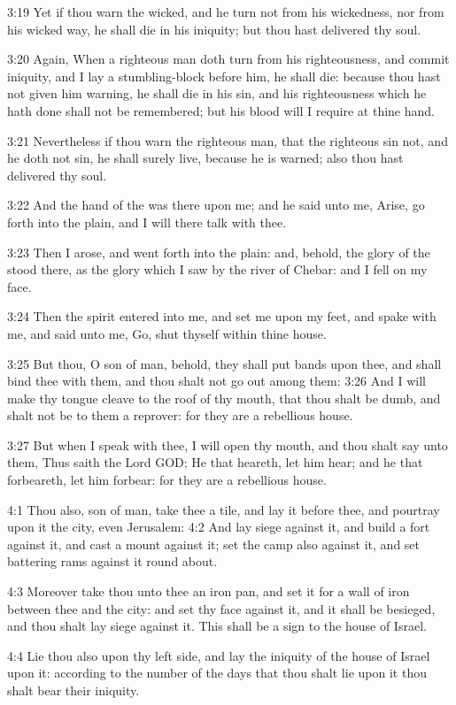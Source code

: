 3:19 Yet if thou warn the wicked, and he turn not from his wickedness, nor from his wicked way, he shall die in his iniquity; but thou hast delivered thy soul.

3:20 Again, When a righteous man doth turn from his righteousness, and commit iniquity, and I lay a stumbling-block before him, he shall die: because thou hast not given him warning, he shall die in his sin, and his righteousness which he hath done shall not be remembered; but his blood will I require at thine hand.

3:21 Nevertheless if thou warn the righteous man, that the righteous sin not, and he doth not sin, he shall surely live, because he is warned; also thou hast delivered thy soul.

3:22 And the hand of the \LORD was there upon me; and he said unto me, Arise, go forth into the plain, and I will there talk with thee.

3:23 Then I arose, and went forth into the plain: and, behold, the glory of the \LORD stood there, as the glory which I saw by the river of Chebar: and I fell on my face.

3:24 Then the spirit entered into me, and set me upon my feet, and spake with me, and said unto me, Go, shut thyself within thine house.

3:25 But thou, O son of man, behold, they shall put bands upon thee, and shall bind thee with them, and thou shalt not go out among them: 3:26 And I will make thy tongue cleave to the roof of thy mouth, that thou shalt be dumb, and shalt not be to them a reprover: for they are a rebellious house.

3:27 But when I speak with thee, I will open thy mouth, and thou shalt say unto them, Thus saith the Lord GOD; He that heareth, let him hear; and he that forbeareth, let him forbear: for they are a rebellious house.

4:1 Thou also, son of man, take thee a tile, and lay it before thee, and pourtray upon it the city, even Jerusalem: 4:2 And lay siege against it, and build a fort against it, and cast a mount against it; set the camp also against it, and set battering rams against it round about.

4:3 Moreover take thou unto thee an iron pan, and set it for a wall of iron between thee and the city: and set thy face against it, and it shall be besieged, and thou shalt lay siege against it. This shall be a sign to the house of Israel.

4:4 Lie thou also upon thy left side, and lay the iniquity of the house of Israel upon it: according to the number of the days that thou shalt lie upon it thou shalt bear their iniquity.

